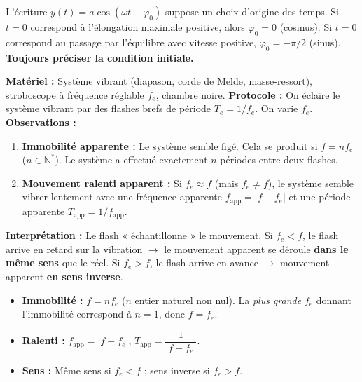 \documentclass[11pt]{article}
\newcounter{popsec}
\newcounter{popsub}
\newcommand{\courssub}[1]{%
  \stepcounter{popsub}%
  \par\vspace{9pt}\noindent{\popxbold\fontsize{11.5}{13}\selectfont\color{popink}{\color{poporange}\thepopsec.\thepopsub}\hspace{6pt}#1}\par\nopagebreak\vspace{4pt}
}
\begin{document}
\begin{attention}
L'écriture $y(t) = a \cos(\omega t + \varphi_0)$ suppose un choix d'origine des temps. Si $t=0$ correspond à l'élongation maximale positive, alors $\varphi_0 = 0$ (cosinus). Si $t=0$ correspond au passage par l'équilibre avec vitesse positive, $\varphi_0 = -\pi/2$ (sinus). \textbf{Toujours préciser la condition initiale.}
\end{attention}

\courssub{Stroboscopie}

\begin{experience}
\textbf{Matériel :} Système vibrant (diapason, corde de Melde, masse-ressort), stroboscope à fréquence réglable $f_e$, chambre noire.
\textbf{Protocole :} On éclaire le système vibrant par des flashes brefs de période $T_e = 1/f_e$. On varie $f_e$.
\textbf{Observations :}
\begin{enumerate}
    \item \textbf{Immobilité apparente :} Le système semble figé. Cela se produit si $f = n f_e$ ($n \in \mathbb{N}^*$). Le système a effectué exactement $n$ périodes entre deux flashes.
    \item \textbf{Mouvement ralenti apparent :} Si $f_e \approx f$ (mais $f_e \neq f$), le système semble vibrer lentement avec une fréquence apparente $f_{\text{app}} = |f - f_e|$ et une période apparente $T_{\text{app}} = 1/f_{\text{app}}$.
\end{enumerate}
\textbf{Interprétation :} Le flash « échantillonne » le mouvement. Si $f_e < f$, le flash arrive en retard sur la vibration $\rightarrow$ le mouvement apparent se déroule \textbf{dans le même sens} que le réel. Si $f_e > f$, le flash arrive en avance $\rightarrow$ mouvement apparent \textbf{en sens inverse}.
\end{experience}

\begin{propriete}
\begin{itemize}
    \item \textbf{Immobilité :} $f = n f_e$ ($n$ entier naturel non nul). La \emph{plus grande} $f_e$ donnant l'immobilité correspond à $n=1$, donc $f = f_e$.
    \item \textbf{Ralenti :} $f_{\text{app}} = |f - f_e|$, \quad $T_{\text{app}} = \dfrac{1}{|f - f_e|}$.
    \item \textbf{Sens :} Même sens si $f_e < f$ ; sens inverse si $f_e > f$.
\end{itemize}
\end{propriete}
\end{document}
